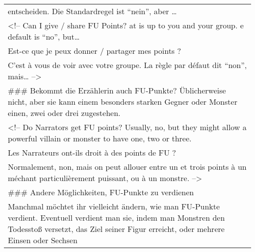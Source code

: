 \documentclass[]{article}
\begin{document}
\begin{longtable}[]{@{}l@{}}
\begin{minipage}[t]{0.05\columnwidth}
entscheiden. Die Standardregel ist ``nein'', aber \ldots{}
\strut\end{minipage}\tabularnewline
\begin{minipage}[t]{0.05\columnwidth}\raggedright\strut
\textless{}!-- Can I give / share FU Points? at is up to you and your
group. e default is ``no'', but\ldots{}
\strut\end{minipage}\tabularnewline
\begin{minipage}[t]{0.05\columnwidth}\raggedright\strut
Est-ce que je peux donner / partager mes points ?
\strut\end{minipage}\tabularnewline
\begin{minipage}[t]{0.05\columnwidth}\raggedright\strut
C'est à vous de voir avec votre groupe. La règle par défaut dit ``non'',
mais\ldots{} --\textgreater{}
\strut\end{minipage}\tabularnewline
\begin{minipage}[t]{0.05\columnwidth}\raggedright\strut
\#\#\# Bekommt die Erzählerin auch FU-Punkte? Üblicherweise nicht, aber
sie kann einem besonders starken Gegner oder Monster einen, zwei oder
drei zugestehen.
\strut\end{minipage}\tabularnewline
\begin{minipage}[t]{0.05\columnwidth}\raggedright\strut
\textless{}!-- Do Narrators get FU points? Usually, no, but they might
allow a powerful villain or monster to have one, two or three.
\strut\end{minipage}\tabularnewline
\begin{minipage}[t]{0.05\columnwidth}\raggedright\strut
Les Narrateurs ont-ils droit à des points de FU ?
\strut\end{minipage}\tabularnewline
\begin{minipage}[t]{0.05\columnwidth}\raggedright\strut
Normalement, non, mais on peut allouer entre un et trois points à un
méchant particulièrement puissant, ou à un monstre. --\textgreater{}
\strut\end{minipage}\tabularnewline
\begin{minipage}[t]{0.05\columnwidth}\raggedright\strut
\#\#\# Andere Möglichkeiten, FU-Punkte zu verdienen
\strut\end{minipage}\tabularnewline
\begin{minipage}[t]{0.05\columnwidth}\raggedright\strut
Manchmal möchtet ihr vielleicht ändern, wie man FU-Punkte verdient.
Eventuell verdient man sie, indem man Monstren den Todesstoß versetzt,
das Ziel seiner Figur erreicht, oder mehrere Einsen oder Sechsen

\end{minipage}
\end{longtable}
\end{document}
